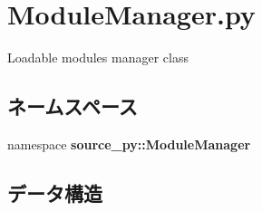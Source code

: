 \section{ModuleManager.py}
\label{_module_manager_8py}
Loadable modules manager class 

\subsection*{ネームスペース}
\begin{CompactItemize}
\item 
namespace \textbf{source\_\-py::ModuleManager}
\end{CompactItemize}
\subsection*{データ構造}
